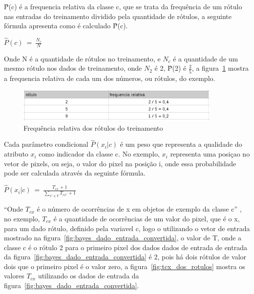 {\^P}(c) é a frequencia relativa da classe c, que se trata da frequência de um rótulo
nas entradas do treinamento dividido pela quantidade de rótulos, a seguinte fórmula
apresenta como é calculado {\^P}(c).

\begin{center}

$ \hat{P}(c) \ = \ \frac{N_c}{N} $
\\
\end{center}

Onde N é a quantidade de rótulos no treinamento, e $N_c$ é a quantidade de um mesmo
rótulo nos dados de treinamento, onde $N_{2}$ é 2, {\^P}(2) é $\frac{2}{5}$, a
figura~\ref{fig:frequencia_relativa} mostra a frequencia relativa de  cada um dos
números, ou rótulos, do exemplo.

\begin{figure}[h]
  \centering
  \includegraphics[width=0.9\textwidth]{figuras/frequencia_relativa.eps}
  \caption{Frequência relativa dos rótulos do treinamento}
  \label{fig:frequencia_relativa}
\end{figure}

Cada parâmetro condicional $\hat{P}(x_i | c)$ é um peso que representa a qualidade
do atributo $x_i$ como indicador da classe c. No exemplo, $x_i$ representa uma
posiçao no vetor de pixels, ou seja, o valor do pixel na posição i, onde essa
probabilidade pode ser calculada através da seguinte fórmula.

\begin{center}

$ \hat{P}(x_i | c) \ = \ \frac{T_{cx} + 1}{\sum\limits_{x' \in V}T_{cx'} + 1} $
\\
\end{center}

``Onde $T_{cx}$ é o número de ocorrências de x em objetos de exemplo da classe c''
, no exemplo, $T_{cx}$ é a quantidade de
ocorrências de um valor do pixel, que é o x, para um dado rótulo, definido pela
variavel c, logo o utilizando o vetor de entrada mostrado na figura~\ref{fig:bayes_dado_entrada_convertida},
o valor de T, onde a classe c é o rótulo 2 para o primeiro pixel dos dados dados
de entrada de entrada da figura~\ref{fig:bayes_dado_entrada_convertida} é 2, pois
há dois rótulos de valor dois que o primeiro pixel é o valor zero, a figura~\ref{fig:tcx_dos_rotulos}
mostra os valores $T_{cx}$ utilizando os dados de entrada da figura~\ref{fig:bayes_dado_entrada_convertida}.

